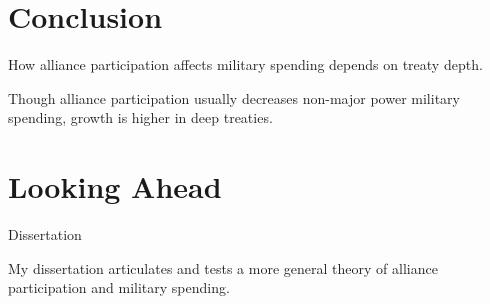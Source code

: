 \documentclass[12pt]{beamer}
\begin{document}

\section{Conclusion}


\begin{frame}[standout]

How alliance participation affects military spending depends on treaty depth.  

\end{frame}

 \begin{frame}[standout]

Though alliance participation usually decreases non-major power military spending, growth is higher in deep treaties.

 \end{frame}



\section{Looking Ahead}


\begin{frame}{Dissertation}

My dissertation articulates and tests a more general theory of alliance participation and military spending. 

\end{frame}


\end{document}
